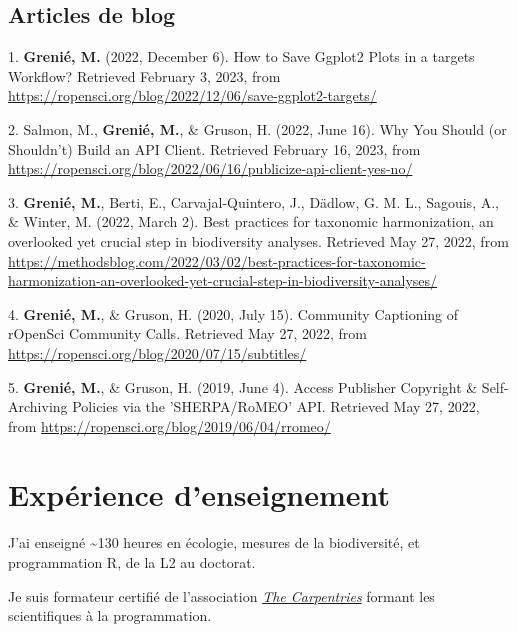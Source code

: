 \documentclass[10pt,a4paper,]{article}
\begin{document}
\hypertarget{articles-de-blog}{%
\subsection{Articles de blog}\label{articles-de-blog}}

\hypertarget{bibliography}{}
\leavevmode{}%
1. \textbf{Grenié, M.} (2022, December 6). How to Save Ggplot2 Plots in
a targets Workflow? Retrieved February 3, 2023, from
\url{https://ropensci.org/blog/2022/12/06/save-ggplot2-targets/}

\leavevmode{}%
2. Salmon, M., \textbf{Grenié, M.}, \& Gruson, H. (2022, June 16). Why
You Should (or Shouldn't) Build an API Client. Retrieved February 16,
2023, from
\url{https://ropensci.org/blog/2022/06/16/publicize-api-client-yes-no/}

\leavevmode{}%
3. \textbf{Grenié, M.}, Berti, E., Carvajal-Quintero, J., Dädlow, G. M.
L., Sagouis, A., \& Winter, M. (2022, March 2). Best practices for
taxonomic harmonization, an overlooked yet crucial step in biodiversity
analyses. Retrieved May 27, 2022, from
\url{https://methodsblog.com/2022/03/02/best-practices-for-taxonomic-harmonization-an-overlooked-yet-crucial-step-in-biodiversity-analyses/}

\leavevmode{}%
4. \textbf{Grenié, M.}, \& Gruson, H. (2020, July 15). Community
Captioning of rOpenSci Community Calls. Retrieved May 27, 2022, from
\url{https://ropensci.org/blog/2020/07/15/subtitles/}

\leavevmode{}%
5. \textbf{Grenié, M.}, \& Gruson, H. (2019, June 4). Access Publisher
Copyright \& Self-Archiving Policies via the 'SHERPA/RoMEO' API.
Retrieved May 27, 2022, from
\url{https://ropensci.org/blog/2019/06/04/rromeo/}

\newpage

\hypertarget{expuxe9rience-denseignement}{%
\section{Expérience d'enseignement}\label{expuxe9rience-denseignement}}

J'ai enseigné \textasciitilde130 heures en écologie, mesures de la
biodiversité, et programmation R, de la L2 au doctorat.

Je suis formateur certifié de l'association
\href{https://carpentries.org/}{\emph{The Carpentries}} formant les
scientifiques à la programmation.
\end{document}
